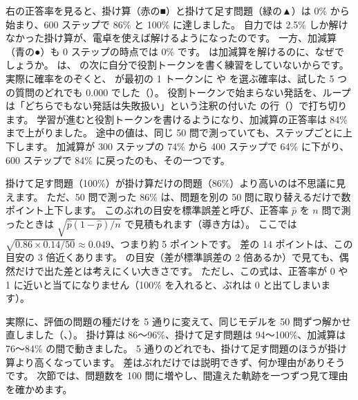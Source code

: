 右の正答率を見ると、掛け算（赤の■）と掛けて足す問題（緑の▲）は 0\% から始まり、600 ステップで 86\% と 100\% に達しました。
自力では 2.5\% しか解けなかった掛け算が、電卓を使えば解けるようになったのです。
一方、加減算（青の●）も 0 ステップの時点では 0\% です。
 は加減算を解けるのに、なぜでしょうか。
 は、 の次に自分で役割トークンを書く練習をしていないからです。
実際に確率をのぞくと、 が最初の 1 トークンに  や  を選ぶ確率は、試した 5 つの質問のどれでも 0.000 でした（）。
役割トークンで始まらない発話を、ループは「どちらでもない発話は失敗扱い」という注釈の付いた  の行（）で打ち切ります。
学習が進むと役割トークンを書けるようになり、加減算の正答率は 84\% まで上がりました。
途中の値は、同じ 50 問で測っていても、ステップごとに上下します。
加減算が 300 ステップの 74\% から 400 ステップで 64\% に下がり、600 ステップで 84\% に戻ったのも、その一つです。

掛けて足す問題（100\%）が掛け算だけの問題（86\%）より高いのは不思議に見えます。
ただ、50 問で測った 86\% は、問題を別の 50 問に取り替えるだけで数ポイント上下します。
このぶれの目安を標準誤差と呼び、正答率 $\hat p$ を $n$ 問で測ったときは $\sqrt{\hat p(1-\hat p)/n}$ で見積もれます（導き方は）。
ここでは $\sqrt{0.86\times0.14/50}\approx0.049$、つまり約 5 ポイントです。
差の 14 ポイントは、この目安の 3 倍近くあります。
の目安（差が標準誤差の 2 倍あるか）で見ても、偶然だけで出た差とは考えにくい大きさです。
ただし、この式は、正答率が 0 や 1 に近いと当てになりません（100\% を入れると、ぶれは 0 と出てしまいます）。

実際に、評価の問題の種だけを 5 通りに変えて、同じモデルを 50 問ずつ解かせ直しました（、）。
掛け算は 86〜96\%、掛けて足す問題は 94〜100\%、加減算は 76〜84\% の間で動きました。
5 通りのどれでも、掛けて足す問題のほうが掛け算より高くなっています。
差はぶれだけでは説明できず、何か理由がありそうです。
次節では、問題数を 100 問に増やし、間違えた軌跡を一つずつ見て理由を確かめます。

